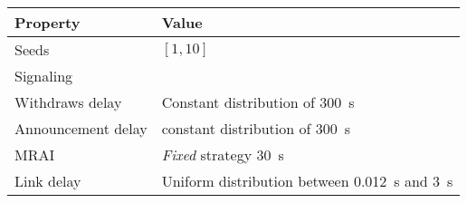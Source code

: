 \begin{center}
	\begin{tabular}{ || m{4cm}| m{8cm} || }
	\hline
	Property & Value \\
	\hline \hline
	Seeds & $[1, 10]$ \\
	\hline
	Signaling & \q{AWAWAWA} \\
	\hline
		Withdraws delay & Constant distribution of \SI{300}{\second} \\
	\hline
	Announcement delay & constant distribution of \SI{300}{\second} \\
	\hline
			MRAI & \textit{Fixed} strategy \SI{30}{\second}\\
	\hline
	Link delay & Uniform distribution between \SI{0.012}{\second} and \SI{3}{\second} \\
	\hline
	\end{tabular}
\end{center}
